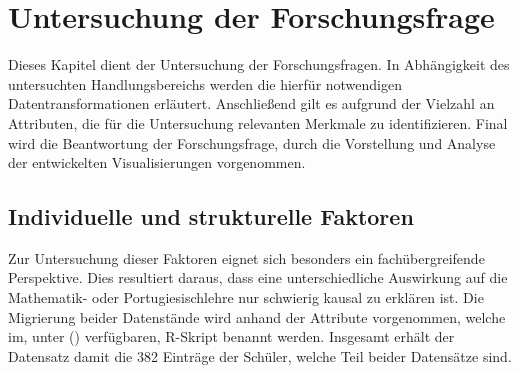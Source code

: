 \chapter[Untersuchung der Forschungsfrage]{Untersuchung der Forschungsfrage}

Dieses Kapitel dient der Untersuchung der Forschungsfragen. 
In Abhängigkeit des untersuchten Handlungsbereichs werden die hierfür notwendigen Datentransformationen erläutert. 
Anschließend gilt es aufgrund der Vielzahl an Attributen, die für die Untersuchung relevanten Merkmale zu identifizieren. 
Final wird die Beantwortung der Forschungsfrage, durch die Vorstellung und Analyse der entwickelten Visualisierungen vorgenommen.

\section{Individuelle und strukturelle Faktoren}

Zur Untersuchung dieser Faktoren eignet sich besonders ein fachübergreifende Perspektive. 
Dies resultiert daraus, dass eine unterschiedliche Auswirkung auf die Mathematik- oder Portugiesischlehre nur schwierig kausal zu erklären ist.
Die Migrierung beider Datenstände wird anhand der Attribute vorgenommen, welche im, unter (\cite[]{student_performance}) verfügbaren, R-Skript benannt werden.
Insgesamt erhält der Datensatz damit die 382 Einträge der Schüler, welche Teil beider Datensätze sind. 


